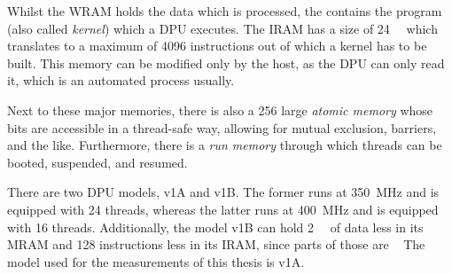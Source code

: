 Whilst the \ac{WRAM} holds the data which is processed, the  contains the program (also called \emph{kernel}) which a \ac{DPU} executes.
The \ac{IRAM} has a size of \qty{24}{\kibi\byte} which translates to a maximum of \num{4096} instructions out of which a kernel has to be built.
This memory can be modified only by the host, as the \ac{DPU} can only read it, which is an automated process usually.

Next to these major memories, there is also a \qty{256}{\bit} large \emph{atomic memory} whose bits are accessible in a thread-safe way, allowing for mutual exclusion, barriers, and the like.
Furthermore, there is a \emph{run memory} through which threads can be booted, suspended, and resumed.

\begin{note}
	There are two \ac{DPU} models, v1A and v1B.
	The former runs at \qty{350}{\mega\hertz} and is equipped with 24 threads, whereas the latter runs at \qty{400}{\mega\hertz} and is equipped with 16 threads.
	Additionally, the model v1B can hold \qty{2}{\kibi\byte} of data less in its \ac{MRAM} and 128 instructions less in its \ac{IRAM}, since parts of those are ~\cite[Introduction~-- DPU chip characteristics]{upmemSDK}
	The model used for the measurements of this thesis is v1A.
\end{note}
